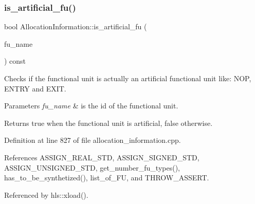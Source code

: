 \subsubsection{\texorpdfstring{is\+\_\+artificial\+\_\+fu()}{is\_artificial\_fu()}}
{\footnotesize\ttfamily bool Allocation\+Information\+::is\+\_\+artificial\+\_\+fu (\begin{DoxyParamCaption}\item[{const unsigned int}]{fu\+\_\+name }\end{DoxyParamCaption}) const}



Checks if the functional unit is actually an artificial functional unit like\+: N\+OP, E\+N\+T\+RY and E\+X\+IT. 


\begin{DoxyParams}{Parameters}
{\em fu\+\_\+name} & is the id of the functional unit. \\
\hline
\end{DoxyParams}
\begin{DoxyReturn}{Returns}
true when the functional unit is artificial, false otherwise. 
\end{DoxyReturn}


Definition at line 827 of file allocation\+\_\+information.\+cpp.



References A\+S\+S\+I\+G\+N\+\_\+\+R\+E\+A\+L\+\_\+\+S\+TD, A\+S\+S\+I\+G\+N\+\_\+\+S\+I\+G\+N\+E\+D\+\_\+\+S\+TD, A\+S\+S\+I\+G\+N\+\_\+\+U\+N\+S\+I\+G\+N\+E\+D\+\_\+\+S\+TD, get\+\_\+number\+\_\+fu\+\_\+types(), has\+\_\+to\+\_\+be\+\_\+synthetized(), list\+\_\+of\+\_\+\+FU, and T\+H\+R\+O\+W\+\_\+\+A\+S\+S\+E\+RT.



Referenced by hls\+::xload().

